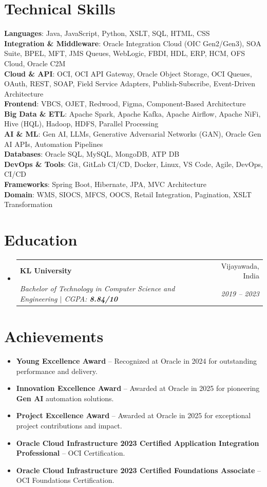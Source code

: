 \documentclass[letterpaper,11pt]{article}
\makeatletter
\newcommand{\resumeItem}[1]{
  \item\small{
    {#1 \vspace{-2pt}}
  }
}
\newcommand{\resumeSubheading}[4]{
  \vspace{-2pt}\item
    \begin{tabular*}{0.97\textwidth}[t]{l@{\extracolsep{\fill}}r}
      \textbf{#1} & #2 \\
      \textit{\small#3} & \textit{\small #4} \\
    \end{tabular*}\vspace{-7pt}
}
\newcommand{\resumeSubHeadingListStart}{\begin{itemize}[leftmargin=0.15in, label={}]}
\newcommand{\resumeSubHeadingListEnd}{\end{itemize}}
\newcommand{\resumeItemListStart}{\begin{itemize}}
\newcommand{\resumeItemListEnd}{\end{itemize}\vspace{-5pt}}
\makeatother
\begin{document}
\section{Technical Skills}
\begin{itemize}[leftmargin=0.15in, label={}]
    \small{\item{
        \textbf{Languages}{: Java, JavaScript, Python, XSLT, SQL, HTML, CSS} \\
        \textbf{Integration \& Middleware}{: Oracle Integration Cloud (OIC Gen2/Gen3), SOA Suite, BPEL, MFT, JMS Queues, WebLogic, FBDI, HDL, ERP, HCM, OFS Cloud, Oracle C2M} \\
        \textbf{Cloud \& API}{: OCI, OCI API Gateway, Oracle Object Storage, OCI Queues, OAuth, REST, SOAP, Field Service Adapters, Publish-Subscribe, Event-Driven Architecture} \\
        \textbf{Frontend}{: VBCS, OJET, Redwood, Figma, Component-Based Architecture} \\
        \textbf{Big Data \& ETL}{: Apache Spark, Apache Kafka, Apache Airflow, Apache NiFi, Hive (HQL), Hadoop, HDFS, Parallel Processing} \\
        \textbf{AI \& ML}{: Gen AI, LLMs, Generative Adversarial Networks (GAN), Oracle Gen AI APIs, Automation Pipelines} \\
        \textbf{Databases}{: Oracle SQL, MySQL, MongoDB, ATP DB} \\
        \textbf{DevOps \& Tools}{: Git, GitLab CI/CD, Docker, Linux, VS Code, Agile, DevOps, CI/CD} \\
        \textbf{Frameworks}{: Spring Boot, Hibernate, JPA, MVC Architecture} \\
        \textbf{Domain}{: WMS, SIOCS, MFCS, OOCS, Retail Integration, Pagination, XSLT Transformation}
    }}
\end{itemize}

\section{Education}
\resumeSubHeadingListStart
    \resumeSubheading
        {KL University}{Vijayawada, India}
        {Bachelor of Technology in Computer Science and Engineering $|$ CGPA: \textbf{8.84/10}}{2019 -- 2023}
\resumeSubHeadingListEnd

\section{Achievements}
\resumeItemListStart
    \resumeItem{\textbf{Young Excellence Award} -- Recognized at Oracle in 2024 for outstanding performance and delivery.}
    \resumeItem{\textbf{Innovation Excellence Award} -- Awarded at Oracle in 2025 for pioneering \textbf{Gen AI} automation solutions.}
    \resumeItem{\textbf{Project Excellence Award} -- Awarded at Oracle in 2025 for exceptional project contributions and impact.}
    \resumeItem{\textbf{Oracle Cloud Infrastructure 2023 Certified Application Integration Professional} -- OCI Certification.}
    \resumeItem{\textbf{Oracle Cloud Infrastructure 2023 Certified Foundations Associate} -- OCI Foundations Certification.}
\resumeItemListEnd
\end{document}
